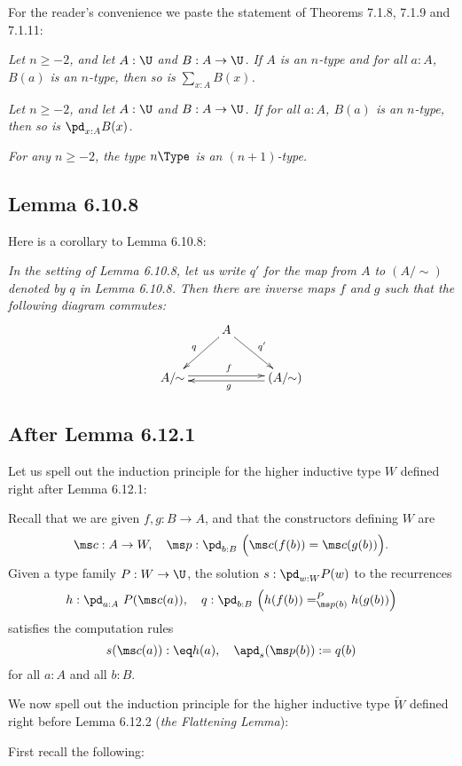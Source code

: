 \documentclass[12pt]{article}
\begin{document}
For the reader's convenience we paste the statement of Theorems 7.1.8, 7.1.9 and 7.1.11:

\nn{} \emph{Let $n\geq-2$, and let $A:\U$ and $B:A\to\U$. If $A$ is an $n$-type and for all $a:A$, $B(a)$ is an $n$-type, then so is $\sum_{x:A}B(x)$.}

\nn{} \emph{Let $n\geq-2$, and let $A:\U$ and $B:A\to\U$. If for all $a:A$, $B(a)$ is an $n$-type, then so is $\pd_{x : A}B(x)$.}

\nn{} \emph{For any $n\geq-2$, the type $n\Type$ is an $(n+1)$-type.}


\subsection{Lemma 6.10.8}\label{6108}

Here is a corollary to Lemma 6.10.8:

\nn\emph{In the setting of Lemma 6.10.8, let us write $q'$ for the map from $A$ to $(A/\!\!\sim)$ denoted by $q$ in Lemma 6.10.8. Then there are inverse maps $f$ and $g$ such that the following diagram commutes:}
$$
\xymatrix{
&A\ar[ld]_q\ar[rd]^{q'}\\ 
A/\!\!\sim\ar@<2pt>[rr]^f&&(A/\!\!\sim)\ar@<2pt>[ll]^g}
$$ 


\subsection{After Lemma 6.12.1}

Let us spell out the induction principle for the higher inductive type $W$ defined right after Lemma 6.12.1:

Recall that we are given $f,g:B\to A$, and that the constructors defining $W$ are 
$$
\ms c:A\to W,\quad\ms p:\pd_{b:B}\ \Big(\ms c(f(b))=\ms c(g(b))\Big).
$$ 
Given a type family $P:W\to\U$, the solution $s:\pd_{w:W}P(w)$ to the recurrences 
$$
h:\pd_{a:A}\ P(\ms c(a)),\quad q:\pd_{b:B}\ \Big(h(f(b))=^P_{\ms p(b)}h(g(b))\Big)
$$ 
satisfies the computation rules 
$$
s(\ms c(a)):\eq h(a),\quad\apd_s(\ms p(b)):=q(b)
$$ 
for all $a:A$ and all $b:B$. 

We now spell out the induction principle for the higher inductive type $\widetilde W$ defined right before Lemma 6.12.2 (\emph{the Flattening Lemma}): 

First recall the following:
\end{document}

